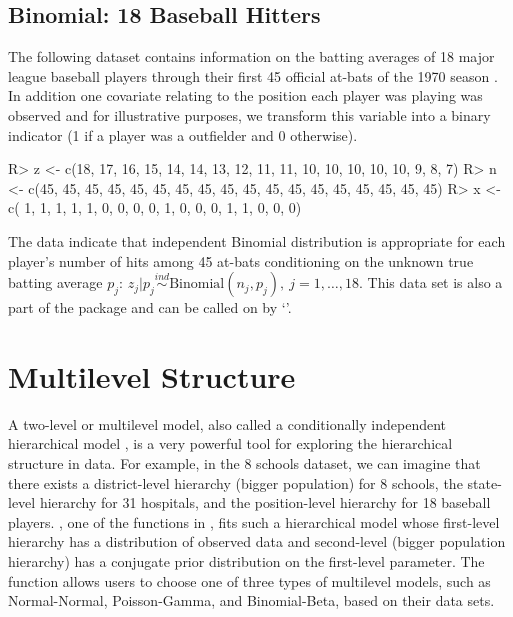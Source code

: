 \documentclass[article]{jss}
\begin{document}
\subsection{Binomial: 18 Baseball Hitters}
The following dataset contains information on the batting averages of 18 major league baseball players through their first 45 official at-bats of the 1970 season \cite{1975}. In addition one covariate relating to the position each player was playing was observed and for illustrative purposes, we transform this variable into a binary indicator (1 if a player was a outfielder and 0 otherwise).
\begin{CodeChunk}
\begin{CodeInput}
R> z <- c(18, 17, 16, 15, 14, 14, 13, 12, 11, 11, 10, 10, 10, 10, 10,  9,  8,  7)
R> n <- c(45, 45, 45, 45, 45, 45, 45, 45, 45, 45, 45, 45, 45, 45, 45, 45, 45, 45)
R> x <- c( 1,  1,  1,  1,  1,  0,  0,  0,  0,  1,  0,  0,  0,  1,  1,  0,  0,  0) 
\end{CodeInput}
\end{CodeChunk}
The data indicate that independent Binomial distribution is appropriate for each player's number of hits among 45 at-bats conditioning on the unknown true batting average $p_{j}$: $z_{j}\vert p_{j}\stackrel{ind}{\sim} \textrm{Binomial}(n_{j}, p_{j}), ~j=1, \ldots, 18$. This data set is also a part of the package and can be called on  by `'.

\section[Multilevel Structure]{Multilevel Structure} \label{multilevel}
A two-level or multilevel model, also called a conditionally independent hierarchical model \cite{1989}, is a very powerful tool for exploring the hierarchical structure in data. For example, in the 8 schools dataset, we can imagine that there exists a district-level hierarchy (bigger population) for 8 schools, the state-level hierarchy for 31 hospitals, and the position-level hierarchy for 18 baseball players. , one of the functions in , fits such a hierarchical model whose first-level hierarchy has a distribution of observed data and second-level (bigger population hierarchy) has a conjugate prior distribution on the first-level parameter. The  function allows users to choose one of three types of multilevel models, such as Normal-Normal, Poisson-Gamma, and Binomial-Beta, based on their data sets. 
\end{document}
